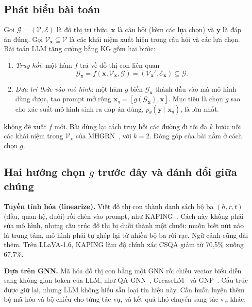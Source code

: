 \subsection{Phát biểu bài toán}
Gọi $\mathcal{G}=(\mathcal{V},\mathcal{E})$ là đồ thị tri thức, $\mathbf{x}$ là câu hỏi (kèm các lựa chọn) và $\mathbf{y}$ là đáp án đúng. Gọi $\mathcal{V}_\mathbf{x}\subseteq\mathcal{V}$ là các khái niệm xuất hiện trong câu hỏi và các lựa chọn. Bài toán LLM tăng cường bằng KG gồm hai bước:
\begin{enumerate}
\item \emph{Truy hồi}: một hàm $f$ trả về đồ thị con liên quan
\begin{equation}
\mathcal{G}_\mathbf{x}=f(\mathbf{x},\mathcal{V}_\mathbf{x},\mathcal{G})=(\mathcal{V}_\mathbf{x}',\mathcal{E}_\mathbf{x})\subseteq\mathcal{G}.
\end{equation}
\item \emph{Đưa tri thức vào mô hình}: một hàm $g$ biến $\mathcal{G}_\mathbf{x}$ thành đầu vào mà mô hình dùng được, tạo prompt mở rộng $\mathbf{x}_g=[g(\mathcal{G}_\mathbf{x}),\mathbf{x}]$. Mục tiêu là chọn $g$ sao cho xác suất mô hình sinh ra đáp án đúng, $p_\theta(\mathbf{y}\mid\mathbf{x}_g)$, là lớn nhất.
\end{enumerate}
\GV{} không đề xuất $f$ mới. Bài dùng lại cách truy hồi các đường đi tối đa $k$ bước nối các khái niệm trong $\mathcal{V}_\mathbf{x}$ của MHGRN~\cite{feng2020mhgrn}, với $k=2$. Đóng góp của bài nằm ở cách chọn $g$.

\subsection{Hai hướng chọn $g$ trước đây và đánh đổi giữa chúng}
\textbf{Tuyến tính hóa (linearize).} Viết đồ thị con thành danh sách bộ ba $(h,r,t)$ (đầu, quan hệ, đuôi) rồi chèn vào prompt, như KAPING~\cite{baek2023kaping}. Cách này không phải sửa mô hình, nhưng cấu trúc đồ thị bị duỗi thành một chuỗi: muốn biết nút nào là trung tâm, mô hình phải tự ghép lại từ nhiều bộ ba rời rạc. Ngữ cảnh cũng dài thêm. Trên LLaVA-1.6, KAPING làm độ chính xác CSQA giảm từ 70,5\% xuống 67,7\%.

\textbf{Dựa trên GNN.} Mã hóa đồ thị con bằng một GNN rồi chiếu vector biểu diễn sang không gian token của LLM, như QA-GNN~\cite{yasunaga2021qagnn}, GreaseLM~\cite{zhang2022greaselm} và GNP~\cite{tian2024gnp}. Cấu trúc được giữ lại, nhưng LLM không hiểu sẵn loại tín hiệu này. Cần huấn luyện thêm bộ mã hóa và bộ chiếu cho từng tác vụ, và kết quả khó chuyển sang tác vụ khác.

